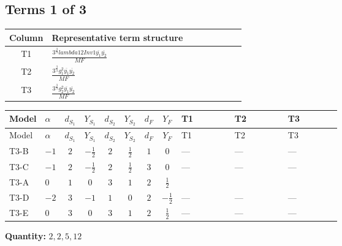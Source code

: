 \documentclass[8pt]{article}
\begin{document}
\begin{landscape}
\subsection*{Terms 1 of 3}
\begin{center}
\begin{tabular}{@{}c >{\raggedright\arraybackslash}p{0.82\linewidth}@{}}
\toprule
Column & Representative term structure \\
\midrule
T1 & \(\displaystyle \frac{3^{\frac{3}{4}} lambda12Inv1 \overline{y_{1}} \overline{y_{2}}}{MF}\) \\
\midrule
T2 & \(\displaystyle \frac{3^{\frac{3}{4}} g_{1}^{2} \overline{y_{1}} \overline{y_{2}}}{MF}\) \\
\midrule
T3 & \(\displaystyle \frac{3^{\frac{3}{4}} g_{2}^{2} \overline{y_{1}} \overline{y_{2}}}{MF}\) \\
\midrule
\bottomrule
\end{tabular}
\end{center}
\smallskip
\tiny
\begin{longtable}{@{}llcccccc >{\raggedright\arraybackslash}p{0.21\linewidth} >{\raggedright\arraybackslash}p{0.21\linewidth} >{\raggedright\arraybackslash}p{0.21\linewidth}@{}}
\toprule
Model & $\alpha$ & $d_{S_1}$ & $Y_{S_1}$ & $d_{S_2}$ & $Y_{S_2}$ & $d_F$ & $Y_F$ & T1 & T2 & T3 \\
\midrule
\endfirsthead
\toprule
Model & $\alpha$ & $d_{S_1}$ & $Y_{S_1}$ & $d_{S_2}$ & $Y_{S_2}$ & $d_F$ & $Y_F$ & T1 & T2 & T3 \\
\midrule
\endhead
T3-B & $-1$ & $2$ & $-\frac{1}{2}$ & $2$ & $\frac{1}{2}$ & $1$ & $0$ & --- & --- & --- \\
\midrule
T3-C & $-1$ & $2$ & $-\frac{1}{2}$ & $2$ & $\frac{1}{2}$ & $3$ & $0$ & --- & --- & --- \\
\midrule
T3-A & $0$ & $1$ & $0$ & $3$ & $1$ & $2$ & $\frac{1}{2}$ & \scriptsize\adjustbox{max width=\linewidth}{$\begin{gathered} \frac{3^{\frac{3}{4}} lambda12Inv1 \overline{y_{1}} \overline{y_{2}}}{6 MF}\end{gathered}$} & \scriptsize\adjustbox{max width=\linewidth}{$\begin{gathered} \frac{3^{\frac{3}{4}} g_{1}^{2} \overline{y_{1}} \overline{y_{2}}}{8 MF}\end{gathered}$} & \scriptsize\adjustbox{max width=\linewidth}{$\begin{gathered} \frac{11 \cdot 3^{\frac{3}{4}} g_{2}^{2} \overline{y_{1}} \overline{y_{2}}}{8 MF}\end{gathered}$} \\
\midrule
T3-D & $-2$ & $3$ & $-1$ & $1$ & $0$ & $2$ & $-\frac{1}{2}$ & --- & --- & --- \\
\midrule
T3-E & $0$ & $3$ & $0$ & $3$ & $1$ & $2$ & $\frac{1}{2}$ & --- & --- & --- \\
\midrule
\bottomrule
\end{longtable}
\clearpage
\noindent\textbf{Quantity: }$\mathrm{2,2,5,12}$\par\smallskip

\end{landscape}
\end{document}
